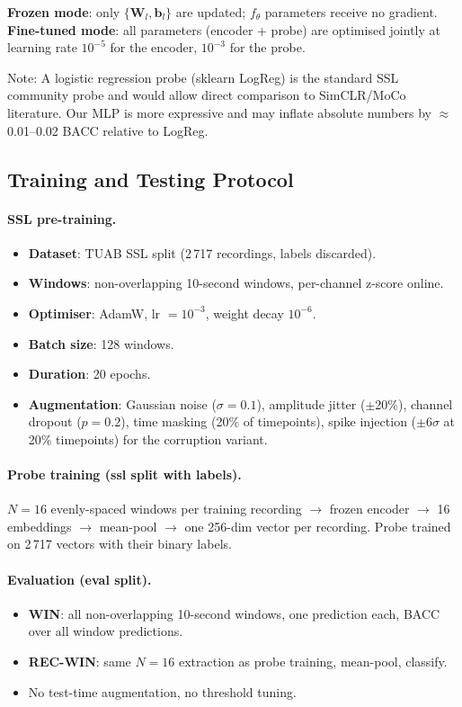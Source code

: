 \documentclass[11pt,a4paper]{article}
\begin{document}
\textbf{Frozen mode}: only $\{\mathbf{W}_l,\mathbf{b}_l\}$ are updated; $f_\theta$ parameters
receive no gradient.\\
\textbf{Fine-tuned mode}: all parameters (encoder + probe) are optimised jointly at
learning rate $10^{-5}$ for the encoder, $10^{-3}$ for the probe.

Note: A logistic regression probe (sklearn LogReg) is the standard SSL community probe
and would allow direct comparison to SimCLR/MoCo literature.  Our MLP is more expressive
and may inflate absolute numbers by $\approx$0.01--0.02 BACC relative to LogReg.

\subsection{Training and Testing Protocol}
\label{sec:protocol}

\paragraph{SSL pre-training.}
\begin{itemize}[noitemsep]
  \item \textbf{Dataset}: TUAB SSL split (2\,717 recordings, labels discarded).
  \item \textbf{Windows}: non-overlapping 10-second windows, per-channel z-score online.
  \item \textbf{Optimiser}: AdamW, lr $= 10^{-3}$, weight decay $10^{-6}$.
  \item \textbf{Batch size}: 128 windows.
  \item \textbf{Duration}: 20 epochs.
  \item \textbf{Augmentation}: Gaussian noise ($\sigma{=}0.1$), amplitude jitter ($\pm$20\%),
    channel dropout ($p{=}0.2$), time masking (20\% of timepoints), spike injection ($\pm6\sigma$
    at 20\% timepoints) for the corruption variant.
\end{itemize}

\paragraph{Probe training (ssl split with labels).}
$N{=}16$ evenly-spaced windows per training recording $\to$ frozen encoder
$\to$ 16 embeddings $\to$ mean-pool $\to$ one 256-dim vector per recording.
Probe trained on 2\,717 vectors with their binary labels.

\paragraph{Evaluation (eval split).}
\begin{itemize}[noitemsep]
  \item \textbf{WIN}: all non-overlapping 10-second windows, one prediction each,
    BACC over all window predictions.
  \item \textbf{REC-WIN}: same $N{=}16$ extraction as probe training, mean-pool, classify.
  \item No test-time augmentation, no threshold tuning.
\end{itemize}
\end{document}
